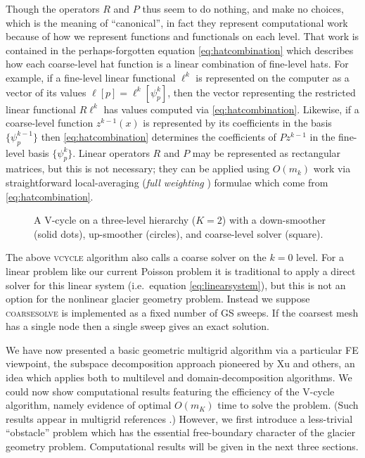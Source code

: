 \documentclass[letterpaper,final,12pt,reqno]{amsart}
\numberwithin{equation}{section}
\numberwithin{figure}{section}
\numberwithin{table}{section}
\begin{document}
Though the operators $R$ and $P$ thus seem to do nothing, and make no choices, which is the meaning of ``canonical'', in fact they represent computational work because of how we represent functions and functionals on each level.  That work is contained in the perhaps-forgotten equation \eqref{eq:hatcombination} which describes how each coarse-level hat function is a linear combination of fine-level hats.  For example, if a fine-level linear functional $\ell^k$ is represented on the computer as a vector of its values $\ell[p] = \ell^k[\psi_p^k]$, then the vector representing the restricted linear functional $R \ell^k$ has values computed via \eqref{eq:hatcombination}.  Likewise, if a coarse-level function $z^{k-1}(x)$ is represented by its coefficients in the basis $\{\psi_p^{k-1}\}$ then \eqref{eq:hatcombination} determines the coefficients of $P z^{k-1}$ in the fine-level basis $\{\psi_p^k\}$.  Linear operators $R$ and $P$ may be represented as rectangular matrices, but this is not necessary; they can be applied using $O(m_k)$ work via straightforward local-averaging (\emph{full weighting} \cite{Briggsetal2000}) formulae which come from \eqref{eq:hatcombination}.

\begin{figure}

\caption{A V-cycle on a three-level hierarchy ($K=2$) with a down-smoother (solid dots), up-smoother (circles), and coarse-level solver (square).}
\label{fig:vcycle}
\end{figure}

The above \textsc{vcycle} algorithm also calls a coarse solver on the $k=0$ level.  For a linear problem like our current Poisson problem it is traditional to apply a direct solver for this linear system (i.e.~equation \eqref{eq:linearsystem}), but this is not an option for the nonlinear glacier geometry problem.  Instead we suppose \textsc{coarsesolve} is implemented as a fixed number of GS sweeps.  If the coarsest mesh has a single node then a single sweep gives an exact solution.

We have now presented a basic geometric multigrid algorithm via a particular FE viewpoint, the subspace decomposition approach pioneered by Xu \cite{Xu1992} and others, an idea which applies both to multilevel and domain-decomposition algorithms.  We could now show computational results featuring the efficiency of the V-cycle algorithm, namely evidence of optimal $O(m_K)$ time to solve the problem.  (Such results appear in multigrid references \cite{Briggsetal2000,Bueler2021,Elmanetal2014,Trottenbergetal2001}.)  However, we first introduce a less-trivial ``obstacle'' problem which has the essential free-boundary character of the glacier geometry problem.  Computational results will be given in the next three sections.
\end{document}
